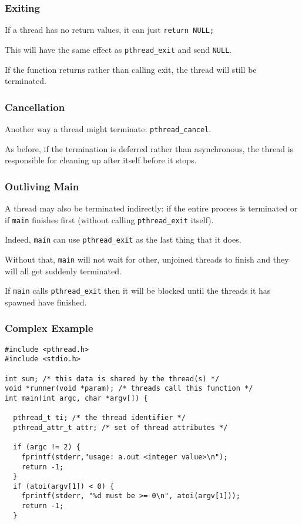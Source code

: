 \begin{frame}
\frametitle{Exiting}

If a thread has no return values, it can just \texttt{return NULL;} 

This will have the same effect as \texttt{pthread\_exit} and send \texttt{NULL}.

If the function returns rather than calling exit, the thread will still be terminated. 




\end{frame}


\begin{frame}
\frametitle{Cancellation}

Another way a thread might terminate: \texttt{pthread\_cancel}. 

As before, if the termination is deferred rather than asynchronous, the thread is responsible for cleaning up after itself before it stops.

\end{frame}


\begin{frame}
\frametitle{Outliving Main}

A thread may also be terminated indirectly: if the entire process is terminated or if \texttt{main} finishes first (without calling \texttt{pthread\_exit} itself). 

Indeed, \texttt{main} can use \texttt{pthread\_exit} as the last thing that it does. 

Without that, \texttt{main} will not wait for other, unjoined threads to finish and they will all get suddenly terminated. 

If \texttt{main} calls \texttt{pthread\_exit} then it will be blocked until the threads it has spawned have finished.

\end{frame}


\begin{frame}[fragile]
\frametitle{Complex Example}

\begin{verbatim}
#include <pthread.h>
#include <stdio.h>

int sum; /* this data is shared by the thread(s) */
void *runner(void *param); /* threads call this function */
int main(int argc, char *argv[]) {

  pthread_t ti; /* the thread identifier */
  pthread_attr_t attr; /* set of thread attributes */

  if (argc != 2) {
    fprintf(stderr,"usage: a.out <integer value>\n"); 
    return -1;
  }
  if (atoi(argv[1]) < 0) {
    fprintf(stderr, "%d must be >= 0\n", atoi(argv[1])); 
    return -1;
  }
\end{verbatim}



\end{frame}

